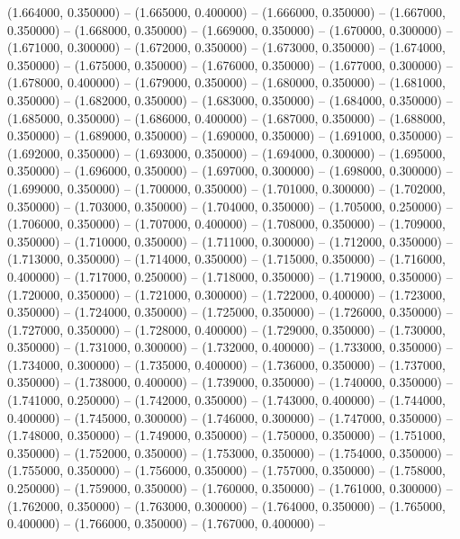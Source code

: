 (1.664000, 0.350000) -- 
(1.665000, 0.400000) -- 
(1.666000, 0.350000) -- 
(1.667000, 0.350000) -- 
(1.668000, 0.350000) -- 
(1.669000, 0.350000) -- 
(1.670000, 0.300000) -- 
(1.671000, 0.300000) -- 
(1.672000, 0.350000) -- 
(1.673000, 0.350000) -- 
(1.674000, 0.350000) -- 
(1.675000, 0.350000) -- 
(1.676000, 0.350000) -- 
(1.677000, 0.300000) -- 
(1.678000, 0.400000) -- 
(1.679000, 0.350000) -- 
(1.680000, 0.350000) -- 
(1.681000, 0.350000) -- 
(1.682000, 0.350000) -- 
(1.683000, 0.350000) -- 
(1.684000, 0.350000) -- 
(1.685000, 0.350000) -- 
(1.686000, 0.400000) -- 
(1.687000, 0.350000) -- 
(1.688000, 0.350000) -- 
(1.689000, 0.350000) -- 
(1.690000, 0.350000) -- 
(1.691000, 0.350000) -- 
(1.692000, 0.350000) -- 
(1.693000, 0.350000) -- 
(1.694000, 0.300000) -- 
(1.695000, 0.350000) -- 
(1.696000, 0.350000) -- 
(1.697000, 0.300000) -- 
(1.698000, 0.300000) -- 
(1.699000, 0.350000) -- 
(1.700000, 0.350000) -- 
(1.701000, 0.300000) -- 
(1.702000, 0.350000) -- 
(1.703000, 0.350000) -- 
(1.704000, 0.350000) -- 
(1.705000, 0.250000) -- 
(1.706000, 0.350000) -- 
(1.707000, 0.400000) -- 
(1.708000, 0.350000) -- 
(1.709000, 0.350000) -- 
(1.710000, 0.350000) -- 
(1.711000, 0.300000) -- 
(1.712000, 0.350000) -- 
(1.713000, 0.350000) -- 
(1.714000, 0.350000) -- 
(1.715000, 0.350000) -- 
(1.716000, 0.400000) -- 
(1.717000, 0.250000) -- 
(1.718000, 0.350000) -- 
(1.719000, 0.350000) -- 
(1.720000, 0.350000) -- 
(1.721000, 0.300000) -- 
(1.722000, 0.400000) -- 
(1.723000, 0.350000) -- 
(1.724000, 0.350000) -- 
(1.725000, 0.350000) -- 
(1.726000, 0.350000) -- 
(1.727000, 0.350000) -- 
(1.728000, 0.400000) -- 
(1.729000, 0.350000) -- 
(1.730000, 0.350000) -- 
(1.731000, 0.300000) -- 
(1.732000, 0.400000) -- 
(1.733000, 0.350000) -- 
(1.734000, 0.300000) -- 
(1.735000, 0.400000) -- 
(1.736000, 0.350000) -- 
(1.737000, 0.350000) -- 
(1.738000, 0.400000) -- 
(1.739000, 0.350000) -- 
(1.740000, 0.350000) -- 
(1.741000, 0.250000) -- 
(1.742000, 0.350000) -- 
(1.743000, 0.400000) -- 
(1.744000, 0.400000) -- 
(1.745000, 0.300000) -- 
(1.746000, 0.300000) -- 
(1.747000, 0.350000) -- 
(1.748000, 0.350000) -- 
(1.749000, 0.350000) -- 
(1.750000, 0.350000) -- 
(1.751000, 0.350000) -- 
(1.752000, 0.350000) -- 
(1.753000, 0.350000) -- 
(1.754000, 0.350000) -- 
(1.755000, 0.350000) -- 
(1.756000, 0.350000) -- 
(1.757000, 0.350000) -- 
(1.758000, 0.250000) -- 
(1.759000, 0.350000) -- 
(1.760000, 0.350000) -- 
(1.761000, 0.300000) -- 
(1.762000, 0.350000) -- 
(1.763000, 0.300000) -- 
(1.764000, 0.350000) -- 
(1.765000, 0.400000) -- 
(1.766000, 0.350000) -- 
(1.767000, 0.400000) -- 
